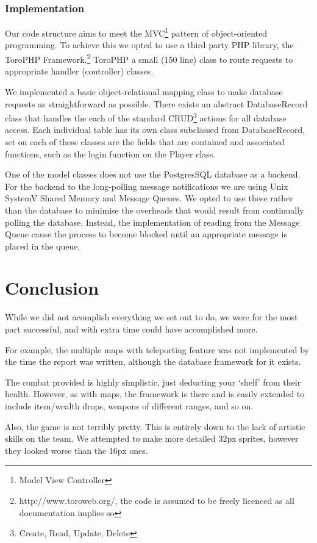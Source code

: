 \documentclass[12pt]{amsart}
\begin{document}
    \subsubsection{Implementation}
      \begin{flushleft}
        Our code structure aims to meet the MVC\footnote{Model View Controller} 
        pattern of object-oriented programming. To achieve this we opted to use a third 
        party PHP library, the ToroPHP Framework.\footnote{http://www.toroweb.org/, 
        the code is assumed to be freely licenced as all documentation implies so} 
        ToroPHP a small (150 line) class to route requests to appropriate handler 
        (controller) classes.

        We implemented a basic object-relational mapping class to make database 
        requests as straightforward as possible. There exists an abstract 
        DatabaseRecord class that handles the each of the standard 
        CRUD\footnote{Create, Read, Update, Delete} actions for all database 
        access. Each individual table has its own class subclassed from 
        DatabaseRecord, set on each of these classes are the fields that are 
        contained and associated functions, such as the login function on the 
        Player class.

        One of the model classes does not use the PostgresSQL database as a 
        backend. For the backend to the long-polling message notifications we
        are using Unix SystemV Shared Memory and Message Queues. We opted to use 
        these rather than the database to minimise the overheads that would 
        result from continually polling the database. Instead, the 
        implementation of reading from the Message Queue cause the process to
        become blocked until an appropriate message is placed in the queue.
      \end{flushleft}

\section{Conclusion}
  \begin{flushleft}
    While we did not acomplish everything we set out to do, we were for the
    most part successful, and with extra time could have accomplished more. 

    For example, the multiple maps with teleporting feature was not implemented
    by the time the report was written, although the database framework for it
    exists. 

    The combat provided is highly simplistic, just deducting your `shelf' from
    their health. However, as with maps, the framework is there and is easily
    extended to include item/wealth drops, weapons of different ranges, and so
    on.

    Also, the game is not terribly pretty. This is entirely down to the lack of
    artistic skills on the team. We attempted to make more detailed 32px
    sprites, however they looked worse than the 16px ones.
  \end{flushleft}
\end{document}
